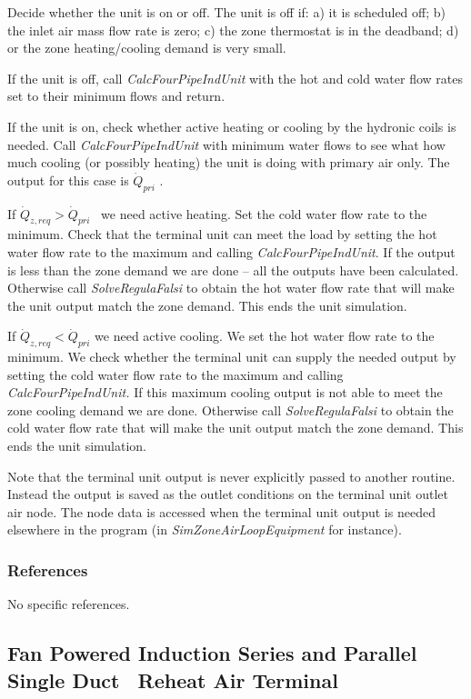Decide whether the unit is on or off. The unit is off if: a) it is scheduled off; b) the inlet air mass flow rate is zero; c) the zone thermostat is in the deadband; d) or the zone heating/cooling demand is very small.

If the unit is off, call \emph{CalcFourPipeIndUnit} with the hot and cold water flow rates set to their minimum flows and return.

If the unit is on, check whether active heating or cooling by the hydronic coils is needed. Call \emph{CalcFourPipeIndUnit} with minimum water flows to see what how much cooling (or possibly heating) the unit is doing with primary air only. The output for this case is \({\dot Q_{pri}}\) .

If \({\dot Q_{z,req}} > {\dot Q_{pri}}\) ~we need active heating. Set the cold water flow rate to the minimum. Check that the terminal unit can meet the load by setting the hot water flow rate to the maximum and calling \emph{CalcFourPipeIndUnit}. If the output is less than the zone demand we are done -- all the outputs have been calculated. Otherwise call \emph{SolveRegulaFalsi} to obtain the hot water flow rate that will make the unit output match the zone demand. This ends the unit simulation.

If \({\dot Q_{z,req}} < {\dot Q_{pri}}\) we need active cooling. We set the hot water flow rate to the minimum. We check whether the terminal unit can supply the needed output by setting the cold water flow rate to the maximum and calling \emph{CalcFourPipeIndUnit.} If this maximum cooling output is not able to meet the zone cooling demand we are done. Otherwise call \emph{SolveRegulaFalsi} to obtain the cold water flow rate that will make the unit output match the zone demand. This ends the unit simulation.

Note that the terminal unit output is never explicitly passed to another routine. Instead the output is saved as the outlet conditions on the terminal unit outlet air node. The node data is accessed when the terminal unit output is needed elsewhere in the program (in \emph{SimZoneAirLoopEquipment} for instance).

\subsubsection{References}\label{references-1-000}

No specific references.

\subsection{Fan Powered Induction Series and Parallel Single Duct~ Reheat Air Terminal}\label{fan-powered-induction-series-and-parallel-single-duct-reheat-air-terminal}

